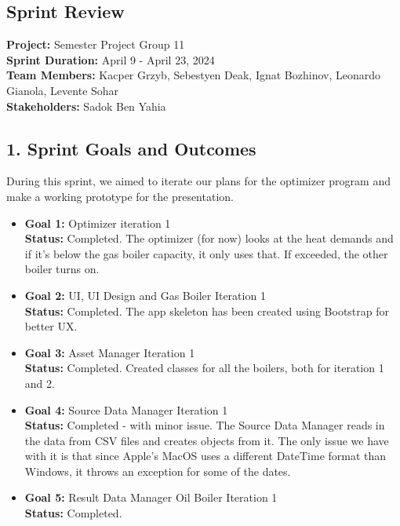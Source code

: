 \documentclass[12pt]{report}
\begin{document}
\clearpage


\subsection*{Sprint Review}
\textbf{Project:} Semester Project Group 11 \\
\textbf{Sprint Duration:} April 9 - April 23, 2024 \\
\textbf{Team Members:} Kacper Grzyb, Sebestyen Deak, Ignat Bozhinov, Leonardo Gianola, Levente Sohar \\
\textbf{Stakeholders:} Sadok Ben Yahia

\subsection*{1. Sprint Goals and Outcomes}
During this sprint, we aimed to iterate our plans for the optimizer program and make a working prototype for the presentation.

\begin{itemize}
    \item \textbf{Goal 1:} Optimizer iteration 1\\
    \textbf{Status:} Completed. The optimizer (for now) looks at the heat demands and if it's below the gas boiler capacity, it only uses that. If exceeded, the other boiler turns on.
    \item \textbf{Goal 2:} UI, UI Design and Gas Boiler Iteration 1\\
    \textbf{Status:} Completed. The app skeleton has been created using Bootstrap for better UX.
    \item \textbf{Goal 3:} Asset Manager Iteration 1\\
    \textbf{Status:} Completed. Created classes for all the boilers, both for iteration 1 and 2.
    \item \textbf{Goal 4:} Source Data Manager Iteration 1\\
    \textbf{Status:} Completed - with minor issue. The Source Data Manager reads in the data from CSV files and creates objects from it. The only issue we have with it is that since Apple's MacOS uses a different DateTime format than Windows, it throws an exception for some of the dates.
    \item \textbf{Goal 5:} Result Data Manager Oil Boiler Iteration 1\\
    \textbf{Status:} Completed.
\end{itemize}
\end{document}
